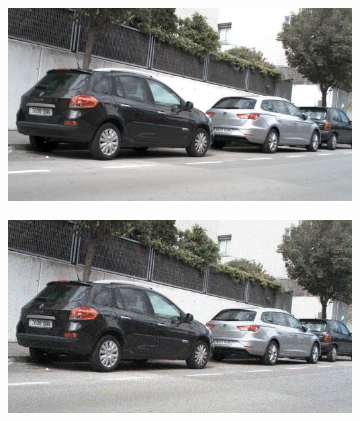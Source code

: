\documentclass[a4paper]{ctexart}
\begin{document}
\begin{figure}[htbp]
\begin{subfigure}{0.08\textwidth}
				\label{fig：Gamma=0.7, Gauss Noise = 1.0}
			\end{subfigure} \\
			
			\vspace{-15pt}
			
			\begin{subfigure}{0.02\textwidth}
				\captionsetup{font=scriptsize}
				\caption*{}
				\vspace{-2pt}
			\end{subfigure}
			\begin{subfigure}{0.08\textwidth}
				\captionsetup{font=scriptsize}
				\includegraphics[width=\linewidth]{picture/Edge Detection/degrade/RGB_001 Gamma=0.8, Gauss Noise=0.0}
				\label{fig: Gamma=0.8, Gauss Noise = 0.0}
			\end{subfigure}
			\begin{subfigure}{0.08\textwidth}
				\captionsetup{font=scriptsize}
				\includegraphics[width=\linewidth]{picture/Edge Detection/degrade/RGB_001 Gamma=0.8, Gauss Noise=0.1}

\end{subfigure}
\end{figure}
\end{document}
